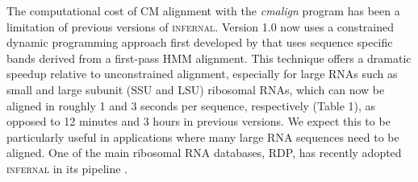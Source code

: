 The computational cost of CM alignment with the \emph{cmalign} program
has been a limitation of previous versions of
\textsc{infernal}. Version 1.0 now uses a constrained dynamic
programming approach first developed by \citet{Brown00}
that uses sequence specific bands derived from a first-pass HMM
alignment. This technique offers a dramatic speedup relative to
unconstrained alignment, especially for large RNAs such as small and
large subunit (SSU and LSU) ribosomal RNAs, which can now be aligned
in roughly 1 and 3 seconds per sequence, respectively (Table 1), as
opposed to 12 minutes and 3 hours in previous versions.
We expect this to be particularly useful in applications where
many large RNA sequences need to be aligned. One of the main ribosomal
RNA databases, RDP, has recently adopted \textsc{infernal} in its
pipeline \citep{Cole09}.


